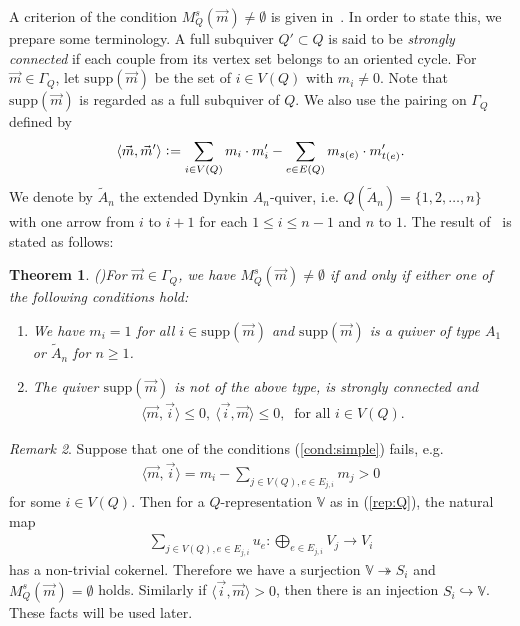 \documentclass[11pt]{amsart}
\theoremstyle{plain}
\newtheorem{thm}{Theorem}[section]
\theoremstyle{definition}
\theoremstyle{remark}
\newtheorem{rmk}[thm]{Remark}
\begin{document}
A criterion of the condition 
$M_Q^s(\vec{m}) \neq \emptyset$
is given in~\cite{MR958897}. 
In order to state this, we prepare some terminology. 
 A full subquiver $Q' \subset Q$ is 
said to be \textit{strongly connected}
if each
 couple from its vertex set belongs to an oriented cycle. 
For $\vec{m} \in \Gamma_Q$, let 
$\mathrm{supp}(\vec{m})$ be
the set of $i \in V(Q)$ with $m_i \neq 0$. 
Note that $\mathrm{supp}(\vec{m})$ is regarded as a full subquiver 
of $Q$. 
We also use the pairing 
on $\Gamma_Q$
defined by
\begin{align}\label{pairing}
\langle \vec{m}, \vec{m}'\rangle 
\cneq \sum_{i\in V(Q)} m_i \cdot m_i' -\sum_{e \in E(Q)}
m_{s(e)} \cdot m_{t(e)}'. 
\end{align}
We denote by $\widetilde{A}_n$ the 
extended Dynkin $A_n$-quiver, i.e. 
$Q(\widetilde{A}_n)=\{1, 2, \ldots, n\}$ 
with one arrow from 
$i$ to $i+1$ for each $1\le i\le n-1$ and 
$n$ to $1$. 
The result of~\cite{MR958897}
is stated as follows: 
\begin{thm}\emph{(\cite[Theorem~4]{MR958897})}\label{thm:criterion}
For $\vec{m} \in \Gamma_Q$, we have 
$M_Q^{s}(\vec{m}) \neq \emptyset$
if and only if 
either one of the following conditions hold: 
\begin{enumerate}
\item 
We have $m_i=1$ for all $i \in \mathrm{supp}(\vec{m})$ 
and 
$\mathrm{supp}(\vec{m})$ is a quiver of type 
$A_1$ or 
$\widetilde{A}_n$ for $n\ge 1$. 
\item
The quiver 
$\mathrm{supp}(\vec{m})$ is not of the above type, 
is strongly connected  
and 
\begin{align}\label{cond:simple}
\langle \vec{m}, \vec{i} \rangle 
\le 0, \ 
\langle \vec{i}, \vec{m} \rangle 
\le 0, \ 
\mbox{ for all }
i \in V(Q).
\end{align}
\end{enumerate}
\end{thm}

\begin{rmk}\label{rmk:simple}
Suppose that one of the conditions (\ref{cond:simple}) fails, e.g. 
\begin{align*}
\langle \vec{m}, \vec{i} \rangle=
m_i-\sum_{j \in V(Q), e \in E_{j, i}} m_j>0
\end{align*}
for some $i \in V(Q)$. 
Then for a $Q$-representation $\mathbb{V}$ as in (\ref{rep:Q}), 
the natural map
\begin{align*}
\sum_{j \in V(Q), e \in E_{j, i}}u_e \colon 
\bigoplus_{e \in E_{j, i}} V_j \to V_i
\end{align*}
has a non-trivial cokernel. 
Therefore we have a surjection 
$\mathbb{V} \twoheadrightarrow S_i$
and $M_Q^s(\vec{m})=\emptyset$ holds. 
Similarly if $\langle \vec{i}, \vec{m} \rangle >0$, 
then there is an injection $S_i \hookrightarrow \mathbb{V}$. 
These facts will be used later. 
\end{rmk}
\end{document}
